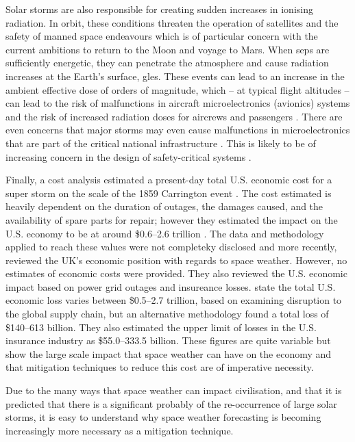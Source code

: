 Solar storms are also responsible for creating sudden increases in ionising radiation. In orbit, these conditions threaten the operation of satellites and the safety of manned space endeavours which is of particular concern with the current ambitions to return to the Moon and voyage to Mars. When \glspl{sep} are sufficiently energetic, they can penetrate the atmosphere and cause radiation increases at the Earth's surface, \glspl{gle}. These events can lead to an increase in the ambient effective dose of orders of magnitude, which -- at typical flight altitudes -- can lead to the risk of malfunctions in aircraft microelectronics (avionics) systems and the risk of increased radiation doses for aircrews and passengers \citep{cannon_extreme_2013, hubert_study_2021}. There are even concerns that major storms may even cause malfunctions in microelectronics that are part of the critical national infrastructure \citep{cannon_extreme_2013}. This is likely to be of increasing concern in the design of safety-critical systems \citep{cannon_extreme_2013}. 

Finally, a cost analysis estimated a present-day total U.S. economic cost for a super storm on the scale of the 1859 Carrington event \citep{homeier_solar_2013}. The cost estimated is heavily dependent on the duration of outages, the damages caused, and the availability of spare parts for repair; however they estimated the impact on the U.S. economy to be at around \$0.6--2.6 trillion \citep{homeier_solar_2013}. The data and methodology applied to reach these values were not completeky disclosed and more recently, \cite{eastwood_economic_2017} reviewed the UK's economic position with regards to space weather. However, no estimates of economic costs were provided. They also reviewed the U.S. economic impact based on power grid outages and insureance losses. \cite{eastwood_economic_2017} state the total U.S. economic loss varies between \$0.5--2.7 trillion, based on examining disruption to the global supply chain, but an alternative methodology found a total loss of \$140--613 billion. They also estimated the upper limit of losses in the U.S. insurance industry as \$55.0--333.5 billion. These figures are quite variable but show the large scale impact that space weather can have on the economy and that mitigation techniques to reduce this cost are of imperative necessity.

Due to the many ways that space weather can impact civilisation, and that it is predicted that there is a significant probably of the re-occurrence of large solar storms, it is easy to understand why space weather forecasting is becoming increasingly more necessary as a mitigation technique. 

